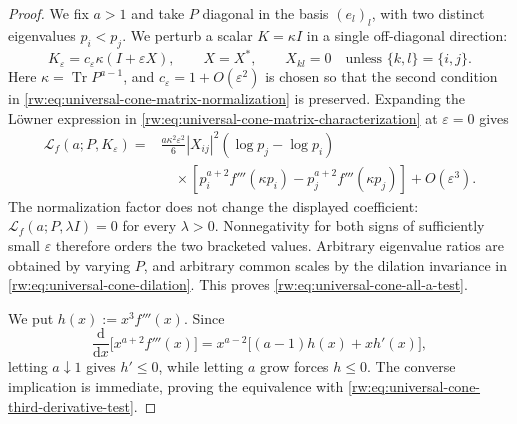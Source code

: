\documentclass[11pt]{article}
\theoremstyle{remark}
\newcommand{\1}{\mathbbm{1}}
\begin{document}
\begin{proof}
We fix \(a>1\) and take \(P\) diagonal in the basis
\((e_l)_l\), with two distinct eigenvalues \(p_i<p_j\).  We perturb a
scalar \(K=\kappa I\) in a single off-diagonal direction:
\begin{equation*}
 K_\varepsilon
 =c_\varepsilon\kappa(I+\varepsilon X),
 \qquad
 X=X^*,\qquad X_{kl}=0
 \quad\text{unless }\{k,l\}=\{i,j\}.
\end{equation*}
Here \(\kappa=\operatorname{Tr}P^{a-1}\), and
\(c_\varepsilon=1+O(\varepsilon^2)\) is chosen so that the second
condition in \eqref{rw:eq:universal-cone-matrix-normalization} is
preserved.  Expanding the L\"owner expression in
\eqref{rw:eq:universal-cone-matrix-characterization} at
\(\varepsilon=0\) gives
\begin{equation}
 \begin{split}
 \mathcal L_f(a;P,K_\varepsilon)
 ={}&\frac{a\kappa^2\varepsilon^2}{6}|X_{ij}|^2
 (\log p_j-\log p_i)\\
 &\quad\times\left[
 p_i^{a+2}f'''(\kappa p_i)
 -p_j^{a+2}f'''(\kappa p_j)
 \right]+O(\varepsilon^3).
 \end{split}
 \label{rw:eq:universal-cone-local-expansion}
\end{equation}
The normalization factor does not change the displayed coefficient:
\(\mathcal L_f(a;P,\lambda I)=0\) for every \(\lambda>0\).
Nonnegativity for both signs of sufficiently small \(\varepsilon\)
therefore orders the two bracketed values.  Arbitrary eigenvalue
ratios are obtained by varying \(P\), and arbitrary common scales by
the dilation invariance in
\eqref{rw:eq:universal-cone-dilation}.  This proves
\eqref{rw:eq:universal-cone-all-a-test}.

We put \(h(x):=x^3f'''(x)\).  Since
\begin{equation*}
 \frac{\mathrm d}{\mathrm dx}
 \bigl[x^{a+2}f'''(x)\bigr]
 =x^{a-2}\bigl[(a-1)h(x)+xh'(x)\bigr],
\end{equation*}
letting \(a\downarrow1\) gives \(h'\leq0\), while letting \(a\) grow
forces \(h\leq0\).  The converse implication is immediate, proving
the equivalence with
\eqref{rw:eq:universal-cone-third-derivative-test}.
\end{proof}
\end{document}
